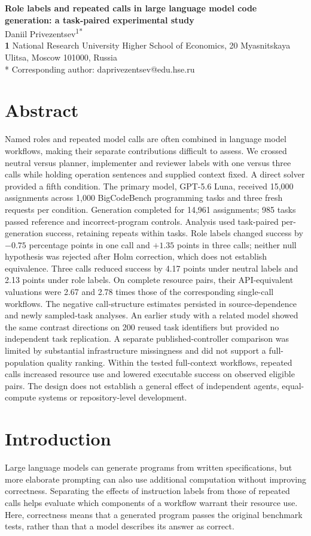 \documentclass[10pt,letterpaper]{article}
\begin{document}
\begin{flushleft}
{\Large\textbf{Role labels and repeated calls in large language model code generation: a task-paired experimental study}}\\[1em]
Daniil Privezentsev\textsuperscript{1*}\\[1em]
\textbf{1} National Research University Higher School of Economics, 20 Myasnitskaya Ulitsa, Moscow 101000, Russia\\[1em]
* Corresponding author: daprivezentsev@edu.hse.ru
\end{flushleft}
\clearpage
\section*{Abstract}
Named roles and repeated model calls are often combined in language model workflows, making their separate contributions difficult to assess. We crossed neutral versus planner, implementer and reviewer labels with one versus three calls while holding operation sentences and supplied context fixed. A direct solver provided a fifth condition. The primary model, GPT-5.6 Luna, received 15,000 assignments across 1,000 BigCodeBench programming tasks and three fresh requests per condition. Generation completed for 14,961 assignments; 985 tasks passed reference and incorrect-program controls. Analysis used task-paired per-generation success, retaining repeats within tasks. Role labels changed success by $-0.75$ percentage points in one call and $+1.35$ points in three calls; neither null hypothesis was rejected after Holm correction, which does not establish equivalence. Three calls reduced success by 4.17 points under neutral labels and 2.13 points under role labels. On complete resource pairs, their API-equivalent valuations were 2.67 and 2.78 times those of the corresponding single-call workflows. The negative call-structure estimates persisted in source-dependence and newly sampled-task analyses. An earlier study with a related model showed the same contrast directions on 200 reused task identifiers but provided no independent task replication. A separate published-controller comparison was limited by substantial infrastructure missingness and did not support a full-population quality ranking. Within the tested full-context workflows, repeated calls increased resource use and lowered executable success on observed eligible pairs. The design does not establish a general effect of independent agents, equal-compute systems or repository-level development.
\linenumbers
\section*{Introduction}
Large language models can generate programs from written specifications, but more elaborate prompting can also use additional computation without improving correctness. Separating the effects of instruction labels from those of repeated calls helps evaluate which components of a workflow warrant their resource use. Here, correctness means that a generated program passes the original benchmark tests, rather than that a model describes its answer as correct.
\end{document}
